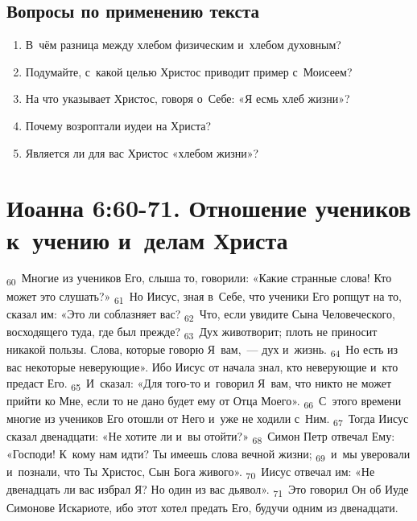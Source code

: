 \documentclass[a4paper,12pt]{article}
\begin{document}
\subsection*{Вопросы по применению текста} 
\begin{enumerate}
    \item В~чём разница между хлебом физическим и~хлебом духовным? 
    
    \myline
    
    \myline
    \item Подумайте, с~какой целью Христос приводит пример с~Моисеем? 
    
    \myline
    
    \myline
    \item На что указывает Христос, говоря о~Себе: «Я есмь хлеб жизни»? 
    
    \myline
    
    \myline
    \item Почему возроптали иудеи на Христа? 
    
    \myline
    
    \myline
    \item Является ли для вас Христос «хлебом жизни»?
    
    \myline
    
    \myline
\end{enumerate}



\section{Иоанна 6:60-71. Отношение учеников к~учению и~делам Христа}


\textsubscript{60}~Многие из учеников Его, слыша то, говорили: «Какие странные слова! Кто может это слушать?»
\textsubscript{61}~Но Иисус, зная в~Себе, что ученики Его ропщут на то, сказал им: «Это ли соблазняет вас?
\textsubscript{62}~Что, если увидите Сына Человеческого, восходящего туда, где был прежде?
\textsubscript{63}~Дух животворит; плоть не приносит никакой пользы. Слова, которые говорю Я~вам,~--- дух и~жизнь.
\textsubscript{64}~Но есть из вас некоторые неверующие». Ибо Иисус от начала знал, кто неверующие и~кто предаст Его.
\textsubscript{65}~И~сказал: «Для того-то и~говорил Я~вам, что никто не может прийти ко Мне, если то не дано будет ему от Отца Моего».
\textsubscript{66}~С~этого времени многие из учеников Его отошли от Него и~уже не ходили с~Ним.
\textsubscript{67}~Тогда Иисус сказал двенадцати: «Не хотите ли и~вы отойти?»
\textsubscript{68}~Симон Петр отвечал Ему: «Господи! К~кому нам идти? Ты имеешь слова вечной жизни;
\textsubscript{69}~и~мы уверовали и~познали, что Ты Христос, Сын Бога живого».
\textsubscript{70}~Иисус отвечал им: «Не двенадцать ли вас избрал Я? Но один из вас дьявол».
\textsubscript{71}~Это говорил Он об Иуде Симонове Искариоте, ибо этот хотел предать Его, будучи одним из двенадцати. 
\end{document}
